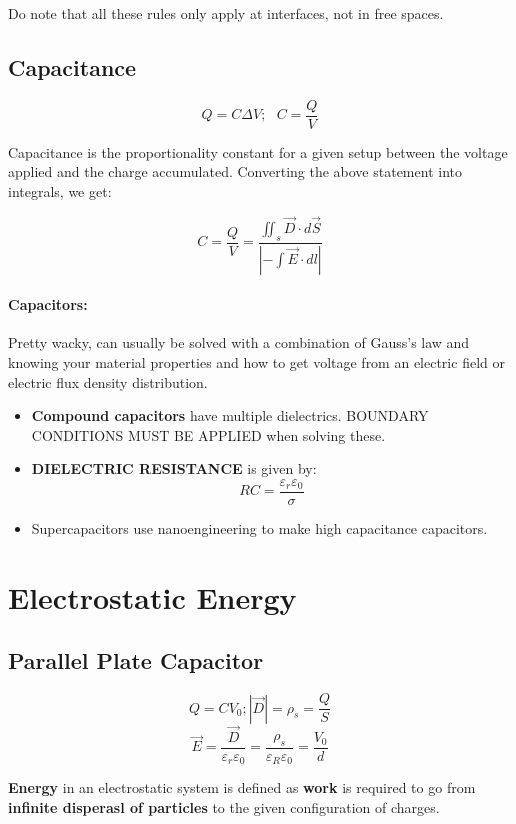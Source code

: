 \documentclass[a4paper,12pt]{report}
\begin{document}
Do note that all these rules only apply at interfaces, not in free spaces.

\subsection{Capacitance}

$$Q = C\Delta V;\,\,\,\, C = \frac{Q}{V}$$

Capacitance is the proportionality constant for a given setup between the voltage applied and the charge accumulated. Converting the above statement into integrals, we get:

$$C = \frac{Q}{V} = \frac{\iint_s \vec{D}\cdot d\vec{S}}{|-\int \vec{E} \cdot dl|}$$

\paragraph{Capacitors: } Pretty wacky, can usually be solved with a combination of Gauss's law and knowing your material properties and how to get voltage from an electric field or electric flux density distribution.

\begin{itemize}
\item \textbf{Compound capacitors} have multiple dielectrics. BOUNDARY CONDITIONS MUST BE APPLIED when solving these.
\item \textbf{DIELECTRIC RESISTANCE} is given by: $$RC = \frac{\varepsilon_r \varepsilon_0}{\sigma}$$
\item Supercapacitors use nanoengineering to make high capacitance capacitors.
\end{itemize}

\section{Electrostatic Energy}

\subsection{Parallel Plate Capacitor}

$$Q = CV_0; |\vec D| = \rho_s = \frac{Q}{S}$$
$$\vec E = \frac{\vec D}{\varepsilon_r \varepsilon_0} = \frac{\rho_s}{\varepsilon_R \varepsilon_0} = \frac{V_0}{d}$$

\textbf{Energy} in an electrostatic system is defined as \textbf{work} is required to go from \textbf{infinite disperasl of particles} to the given configuration of charges.
\end{document}
